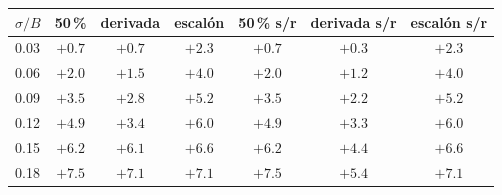 \begin{tabular}{lcccccc}
\toprule
\textbf{$\sigma/B$} & \textbf{50\,\%} & \textbf{derivada} & \textbf{escalón} & \textbf{50\,\% s/r} & \textbf{derivada s/r} & \textbf{escalón s/r} \\
\midrule
0.03 & $+0.7$ & $+0.7$ & $+2.3$ & $+0.7$ & $+0.3$ & $+2.3$ \\
0.06 & $+2.0$ & $+1.5$ & $+4.0$ & $+2.0$ & $+1.2$ & $+4.0$ \\
0.09 & $+3.5$ & $+2.8$ & $+5.2$ & $+3.5$ & $+2.2$ & $+5.2$ \\
0.12 & $+4.9$ & $+3.4$ & $+6.0$ & $+4.9$ & $+3.3$ & $+6.0$ \\
0.15 & $+6.2$ & $+6.1$ & $+6.6$ & $+6.2$ & $+4.4$ & $+6.6$ \\
0.18 & $+7.5$ & $+7.1$ & $+7.1$ & $+7.5$ & $+5.4$ & $+7.1$ \\
\bottomrule
\end{tabular}
